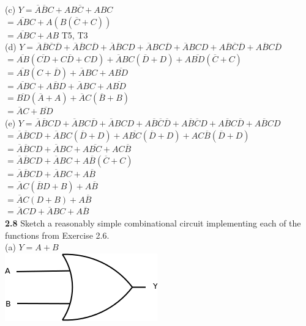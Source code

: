 \documentclass[12pt,a4paper]{report}
\newcommand*{\al}{\overline{A}}
\newcommand*{\bl}{\overline{B}}
\newcommand*{\cl}{\overline{C}}
\newcommand*{\dl}{\overline{D}}
\begin{document}
\begin{normalsize}
(c) $ Y = \overline{A}\overline{B}C + AB\overline{C} + ABC $ \\
$ = \overline{AB}C + A(B(\cl{}+C)) $ \\ 
$ = \overline{AB}C + AB $ T5, T3 \\

(d) $ Y = \overline{A}\overline{B}\overline{C}\overline{D} + \overline{A}\overline{B}C\overline{D} + \overline{A}\overline{B}CD + \overline{A}BC\overline{D} + \overline{A}BCD + A\overline{B}\overline{C}\overline{D} + A\overline{B}C\overline{D} $ \\
$ = \overline{AB}(\overline{CD} + C\dl{} + CD) + \al{}BC(\dl{} + D) + A\overline{BD}(\cl{} + C)$ \\
$ = \overline{AB}(C + \dl{}) + \al{}BC + A\overline{BD}  $ \\
$ = \overline{AB}C + \overline{ABD} + \al{}BC + A\overline{BD} $ \\
$ = \overline{BD}(\al{} + A) + \al{}C(\bl{} + B) $ \\
$ = \al{}C + \overline{BD} $ \\

(e) $ Y = \overline{A}\overline{B}CD + \overline{A}BC\overline{D} + \overline{A}BCD + A\overline{B}\overline{C}\overline{D} + A\overline{B}\overline{C}D + A\overline{B}C\overline{D} + A\overline{B}CD $ \\
$ = \overline{A}\overline{B}CD + \al{}BC(\dl{} + D) + A\overline{BC}(\dl{} + D) + AC\bl{}(\dl{} + D) $ \\
$ = \overline{A}\overline{B}CD + \al{}BC + A\overline{BC} + AC\bl{} $ \\
$ = \overline{A}\overline{B}CD + \al{}BC + A\bl{}(\cl{} + C) $ \\
$ = \overline{A}\overline{B}CD + \al{}BC + A\bl{} $ \\
$ = \al{}C(\bl{}D + B) + A\bl{} $ \\
$ = \al{}C(D + B) + A\bl{} $ \\
$ = \al{}CD + \al{}BC + A\bl{} $ \\


\textbf{2.8} Sketch a reasonably simple combinational circuit implementing each of the functions from Exercise 2.6. \\
(a) $ Y = A + B $ \\
\includegraphics[scale=1]{2_8A} \\


\end{normalsize}
\end{document}

